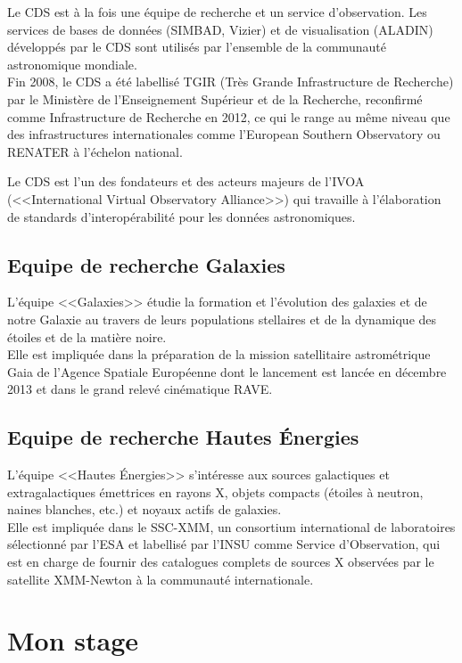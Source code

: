 \documentclass[a4paper,french,12pt]{article}
\begin{document}
		Le CDS est à la fois une équipe de recherche et un service d’observation.
		Les services de bases de données (SIMBAD, Vizier) et de visualisation (ALADIN) développés par le CDS
		sont utilisés par l’ensemble de la communauté astronomique mondiale. \\
		Fin 2008, le CDS a été labellisé TGIR (Très Grande Infrastructure de Recherche) par le Ministère de l'Enseignement Supérieur et de la Recherche,
		reconfirmé comme Infrastructure de Recherche en 2012, ce qui le range au même niveau que des infrastructures internationales
		comme l’European Southern Observatory ou RENATER à l’échelon national.

		Le CDS est l'un des fondateurs et des acteurs majeurs de l'IVOA (<<International Virtual Observatory Alliance>>) qui travaille à
		l'élaboration de standards d'interopérabilité pour les données astronomiques.

	\subsection{Equipe de recherche Galaxies}

		L’équipe <<Galaxies>> étudie la formation et l’évolution des galaxies et de notre Galaxie
		au travers de leurs populations stellaires et de la dynamique des étoiles et de la matière noire. \\
		Elle est impliquée dans la préparation de la mission satellitaire astrométrique Gaia de l’Agence Spatiale Européenne
		dont le lancement est lancée en décembre 2013 et dans le grand relevé cinématique RAVE.

	\subsection{Equipe de recherche Hautes Énergies}

		L’équipe <<Hautes Énergies>> s’intéresse aux sources galactiques et extragalactiques émettrices en rayons X,
		objets compacts (étoiles à neutron, naines blanches, etc.) et noyaux actifs de galaxies.\\
		Elle est impliquée dans le SSC-XMM, un consortium international de laboratoires sélectionné par l’ESA
		et labellisé par l’INSU comme Service d’Observation, qui est en charge de fournir des catalogues complets
		de sources X observées par le satellite XMM-Newton à la communauté internationale.

\section{Mon stage}
\end{document}
